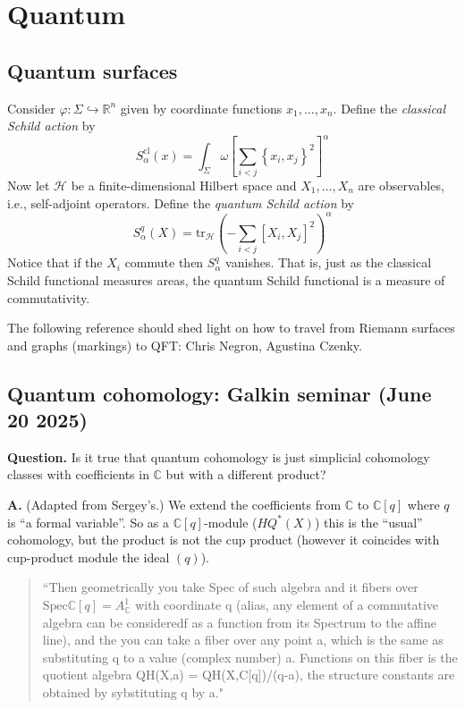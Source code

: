 \section{Quantum}
\label{section-quantum}

\subsection{Quantum surfaces}
\label{subsection-quantum-surfaces}

Consider $\varphi:\Sigma\hookrightarrow \mathbb{R}^n$ given by coordinate
functions $x_1,\ldots,x_n$. Define the {\it classical Schild action} by
$$
S^{\text{cl}}_\alpha(x)=\int_\Sigma
\omega\left[\sum_{i<j}\left\{x_i,x_j\right\}^2 \right]^\alpha
$$
Now let $\mathcal{H}$ be a finite-dimensional Hilbert space and $X_1,\ldots,X_n$ are
observables, i.e., self-adjoint operators. Define the {\it quantum Schild
action} by
$$
S_\alpha^q(X)=\text{tr}_{\mathcal{H}}\left(-\sum_{i<j}[X_i,X_j]^2\right)^\alpha
$$
Notice that if the $X_i$ commute then $S_\alpha^q$ vanishes. That is, just as
the classical Schild functional measures areas, the quantum Schild functional
is a measure of commutativity.

\medskip\noindent

The following reference should shed light on how to travel from Riemann surfaces
and graphs (markings) to QFT: Chris Negron, Agustina Czenky.

\subsection{Quantum cohomology: Galkin seminar (June 20 2025)}
\label{subsection-Galkin-June-20}

{\bf Question.} Is it true that quantum cohomology is just simplicial cohomology
classes with coefficients in $\mathbb{C}$ but with a different product?

{\bf A.} (Adapted from Sergey's.) We extend the coefficients from $\mathbb{C}$
to $\mathbb{C}[q]$ where $q$ is ``a formal variable''. So as a
$\mathbb{C}[q]$-module ($HQ^*(X)$) this is the ``usual'' cohomology, but the
product is not the cup product (however it coincides with cup-product module the
ideal $(q)$).

\begin{quotation}
``Then geometrically you take Spec of such algebra and it
fibers over $\text{Spec} \mathbb{C}[q] = A^1_\mathbb{C}$ with coordinate q
(alias, any element of a commutative algebra can be consideredf as a function
from its Spectrum to the affine line), and the you can take a fiber over any
point a, which is the same as substituting q to a value (complex number) a.
Functions on this fiber is the quotient algebra QH(X,a) = QH(X,C[q])/(q-a), the
structure constants are obtained by sybstituting q by a."
\end{quotation}


